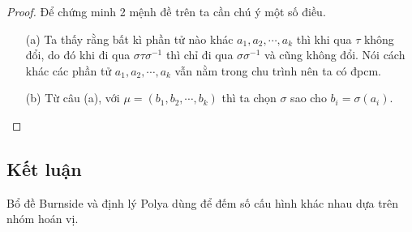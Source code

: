 \begin{proof}
    Để chứng minh 2 mệnh đề trên ta cần chú ý một số điều.

    \begin{enumerate}
        \item [(a)] Ta thấy rằng bất kì phần tử nào khác $a_1, a_2, \cdots, a_k$ thì khi qua $\tau$ không đổi, do đó khi đi qua $\sigma \tau \sigma^{-1}$ thì chỉ đi qua $\sigma \sigma^{-1}$ và cũng không đổi. Nói cách khác các phần tử $a_1, a_2, \cdots, a_k$ vẫn nằm trong chu trình nên ta có đpcm.
        \item [(b)] Từ câu (a), với $\mu = (b_1, b_2, \cdots, b_k)$ thì ta chọn $\sigma$ sao cho $b_i = \sigma(a_i)$.
    \end{enumerate}    
\end{proof}


\subsection{Kết luận}

Bổ đề Burnside và định lý Polya dùng để đếm số cấu hình khác nhau dựa trên nhóm hoán vị.